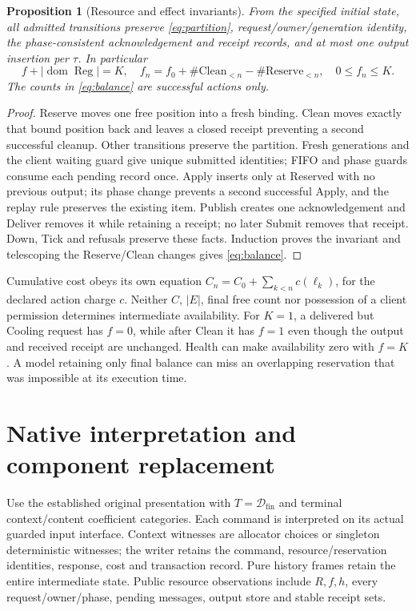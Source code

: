 \documentclass[11pt]{article}
\newtheorem{proposition}[theorem]{Proposition}
\newcommand{\Reg}{\operatorname{Reg}}
\begin{document}
\begin{proposition}[Resource and effect invariants]\label{prop:resource-invariants}
From the specified initial state, all admitted transitions preserve \eqref{eq:partition}, request/owner/generation identity, the phase-consistent acknowledgement and receipt records, and at most one output insertion per $\tau$. In particular
\[
 f+|\operatorname{dom}\Reg|=K,\quad
 f_n=f_0+\#\mathrm{Clean}_{<n}-\#\mathrm{Reserve}_{<n},\quad 0\leq f_n\leq K.
 \tag{B}\label{eq:balance}
\]
The counts in \eqref{eq:balance} are successful actions only.
\end{proposition}
\begin{proof}
Reserve moves one free position into a fresh binding. Clean moves exactly that bound position back and leaves a closed receipt preventing a second successful cleanup. Other transitions preserve the partition. Fresh generations and the client waiting guard give unique submitted identities; FIFO and phase guards consume each pending record once. Apply inserts only at Reserved with no previous output; its phase change prevents a second successful Apply, and the replay rule preserves the existing item. Publish creates one acknowledgement and Deliver removes it while retaining a receipt; no later Submit removes that receipt. Down, Tick and refusals preserve these facts. Induction proves the invariant and telescoping the Reserve/Clean changes gives \eqref{eq:balance}.
\end{proof}

Cumulative cost obeys its own equation $C_n=C_0+\sum_{k<n}c(\ell_k)$, for the declared action charge $c$. Neither $C$, $|E|$, final free count nor possession of a client permission determines intermediate availability. For $K=1$, a delivered but Cooling request has $f=0$, while after Clean it has $f=1$ even though the output and received receipt are unchanged. Health can make availability zero with $f=K$. A model retaining only final balance can miss an overlapping reservation that was impossible at its execution time.

\section{Native interpretation and component replacement}

Use the established original presentation with $T=\mathcal D_{\mathrm{fin}}$ and terminal context/content coefficient categories. Each command is interpreted on its actual guarded input interface. Context witnesses are allocator choices or singleton deterministic witnesses; the writer retains the command, resource/reservation identities, response, cost and transaction record. Pure history frames retain the entire intermediate state. Public resource observations include $R,f,h$, every request/owner/phase, pending messages, output store and stable receipt sets.
\end{document}
